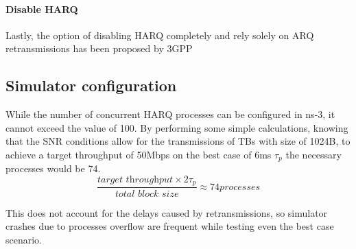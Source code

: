 \paragraph{Disable \ac{HARQ}}
Lastly, the option of disabling \ac{HARQ} completely and rely solely on \ac{ARQ} retransmissions has been proposed by 3GPP \cite{hybrid-arq-schemes-muk}


\subsection{Simulator configuration}
While the number of concurrent HARQ processes can be configured in ns-3, it cannot exceed the value of 100. By performing some simple calculations, knowing that the \ac{SNR} conditions allow for the transmissions of \ac{TB}s with size of 1024B, to achieve a target throughput of 50Mbps on the best case of 6ms $\tau_p$ the necessary processes would be 74.
$$\frac{\textit{target throughput} \times 2\tau_p}{\textit{total block size}} \approx 74 \textit{processes}$$

This does not account for the delays caused by retransmissions, so simulator crashes due to processes overflow are frequent while testing even the best case scenario.

